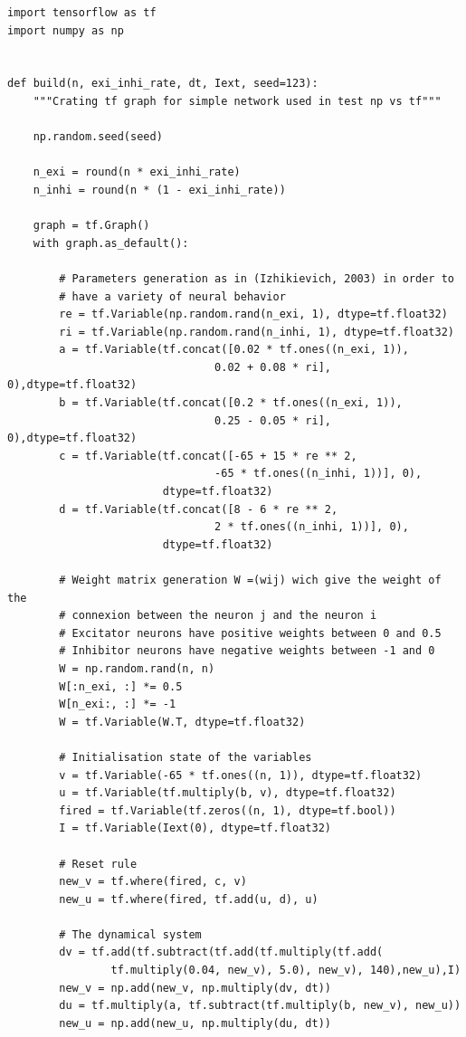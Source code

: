 \documentclass[12pt]{scrartcl}
\begin{document}
\begin{lstlisting}[caption = {Numpy vs Tensorflow : Implémentation Tensorflow}]
import tensorflow as tf
import numpy as np


def build(n, exi_inhi_rate, dt, Iext, seed=123):
    """Crating tf graph for simple network used in test np vs tf"""

    np.random.seed(seed)

    n_exi = round(n * exi_inhi_rate)
    n_inhi = round(n * (1 - exi_inhi_rate))

    graph = tf.Graph()
    with graph.as_default():

        # Parameters generation as in (Izhikievich, 2003) in order to 
        # have a variety of neural behavior
        re = tf.Variable(np.random.rand(n_exi, 1), dtype=tf.float32)
        ri = tf.Variable(np.random.rand(n_inhi, 1), dtype=tf.float32)
        a = tf.Variable(tf.concat([0.02 * tf.ones((n_exi, 1)),
                                0.02 + 0.08 * ri], 0),dtype=tf.float32)
        b = tf.Variable(tf.concat([0.2 * tf.ones((n_exi, 1)),
                                0.25 - 0.05 * ri], 0),dtype=tf.float32)
        c = tf.Variable(tf.concat([-65 + 15 * re ** 2,
                                -65 * tf.ones((n_inhi, 1))], 0),
                        dtype=tf.float32)
        d = tf.Variable(tf.concat([8 - 6 * re ** 2,
                                2 * tf.ones((n_inhi, 1))], 0),
                        dtype=tf.float32)

        # Weight matrix generation W =(wij) wich give the weight of the 
        # connexion between the neuron j and the neuron i
        # Excitator neurons have positive weights between 0 and 0.5
        # Inhibitor neurons have negative weights between -1 and 0
        W = np.random.rand(n, n)
        W[:n_exi, :] *= 0.5
        W[n_exi:, :] *= -1
        W = tf.Variable(W.T, dtype=tf.float32)

        # Initialisation state of the variables
        v = tf.Variable(-65 * tf.ones((n, 1)), dtype=tf.float32)
        u = tf.Variable(tf.multiply(b, v), dtype=tf.float32)
        fired = tf.Variable(tf.zeros((n, 1), dtype=tf.bool))
        I = tf.Variable(Iext(0), dtype=tf.float32)

        # Reset rule
        new_v = tf.where(fired, c, v)
        new_u = tf.where(fired, tf.add(u, d), u)

        # The dynamical system
        dv = tf.add(tf.subtract(tf.add(tf.multiply(tf.add(
                tf.multiply(0.04, new_v), 5.0), new_v), 140),new_u),I)
        new_v = np.add(new_v, np.multiply(dv, dt))
        du = tf.multiply(a, tf.subtract(tf.multiply(b, new_v), new_u))
        new_u = np.add(new_u, np.multiply(du, dt))


\end{lstlisting}
\end{document}
